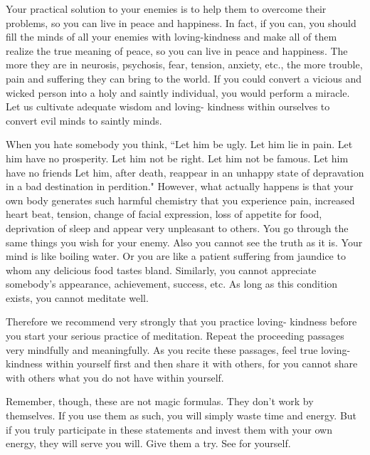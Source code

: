 Your practical solution to your enemies is to help them to overcome their
problems, so you can live in peace and happiness. In fact, if you can, you
should fill the minds of all your enemies with loving-kindness and make all of
them realize the true meaning of peace, so you can live in peace and happiness.
The more they are in neurosis, psychosis, fear, tension, anxiety, etc., the more
trouble, pain and suffering they can bring to the world. If you could convert a
vicious and wicked person into a holy and saintly individual, you would perform
a miracle. Let us cultivate adequate wisdom and loving- kindness within
ourselves to convert evil minds to saintly minds.

When you hate somebody you think, ``Let him be ugly. Let him lie in pain. Let him
have no prosperity. Let him not be right.  Let him not be famous. Let him have
no friends Let him, after death, reappear in an unhappy state of depravation in
a bad destination in perdition." However, what actually happens is that your own
body generates such harmful chemistry that you experience pain, increased heart
beat, tension, change of facial expression, loss of appetite for food,
deprivation of sleep and appear very unpleasant to others. You go through the
same things you wish for your enemy.  Also you cannot see the truth as it is.
Your mind is like boiling water. Or you are like a patient suffering from
jaundice to whom any delicious food tastes bland. Similarly, you cannot
appreciate somebody's appearance, achievement, success, etc. As long as this
condition exists, you cannot meditate well.

Therefore we recommend very strongly that you practice loving- kindness before
you start your serious practice of meditation.  Repeat the proceeding passages
very mindfully and meaningfully. As you recite these passages, feel true
loving-kindness within yourself first and then share it with others, for you
cannot share with others what you do not have within yourself.

Remember, though, these are not magic formulas. They don't work by themselves.
If you use them as such, you will simply waste time and energy. But if you truly
participate in these statements and invest them with your own energy, they will
serve you will. Give them a try. See for yourself.
